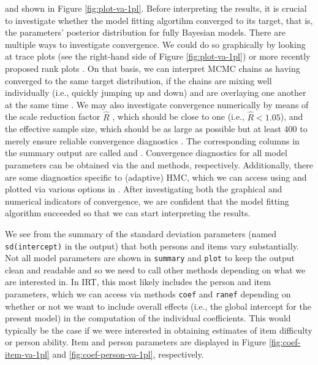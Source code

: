 \documentclass[
]{jss}
\begin{document}
and shown in Figure \ref{fig:plot-va-1pl}. Before interpreting the
results, it is crucial to investigate whether the model fitting
algortihm converged to its target, that is, the parameters' posterior
distribution for fully Bayesian models. There are multiple ways to
investigate convergence. We could do so graphically by looking at trace
plots (see the right-hand side of Figure \ref{fig:plot-va-1pl}) or more
recently proposed rank plots \citep{vehtari2019}. On that basis, we can
interpret MCMC chains as having converged to the same target
distribution, if the chains are mixing well individually (i.e., quickly
jumping up and down) and are overlaying one another at the same time
\citep{gelman2013}. We may also investigate convergence numerically by
means of the scale reduction factor \(\widehat{R}\)
\citep{gelman1992, gelman2013, vehtari2019}, which should be close to
one (i.e., \(\widehat{R} < 1.05\)), and the effective sample size, which
should be as large as possible but at least 400 to merely ensure
reliable convergence diagnostics \citep{vehtari2019}. The corresponding
columns in the summary output are called  and
. Convergence diagnostics for all model parameters can
be obtained via the  and  methods,
respectively. Additionally, there are some diagnostics specific to
(adaptive) HMC, which we can access using  and plotted
via various options in . After investigating both the
graphical and numerical indicators of convergence, we are confident that
the model fitting algorithm succeeded so that we can start interpreting
the results.

We see from the summary of the standard deviation parameters (named
\texttt{sd(intercept)} in the output) that both persons and items vary
substantially. Not all model parameters are shown in \texttt{summary}
and \texttt{plot} to keep the output clean and readable and so we need
to call other methods depending on what we are interested in. In IRT,
this most likely includes the person and item parameters, which we can
access via methods \texttt{coef} and \texttt{ranef} depending on whether
or not we want to include overall effects (i.e., the global intercept
for the present model) in the computation of the individual
coefficients. This would typically be the case if we were interested in
obtaining estimates of item difficulty or person ability. Item and
person parameters are displayed in Figure \ref{fig:coef-item-va-1pl} and
\ref{fig:coef-person-va-1pl}, respectively.
\end{document}
